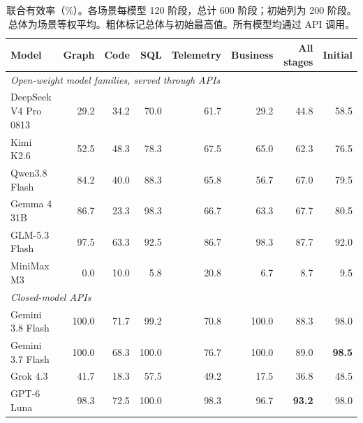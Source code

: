 \begin{table}[t]
\centering\small\setlength{\tabcolsep}{5pt}
\begin{tabular}{lrrrrrrr}
\toprule
Model & Graph & Code & SQL & Telemetry & Business & All stages & Initial \\
\midrule
\multicolumn{8}{l}{\emph{Open-weight model families, served through APIs}}\\
DeepSeek V4 Pro 0813 & 29.2 & 34.2 & 70.0 & 61.7 & 29.2 & 44.8 & 58.5 \\
Kimi K2.6 & 52.5 & 48.3 & 78.3 & 67.5 & 65.0 & 62.3 & 76.5 \\
Qwen3.8 Flash & 84.2 & 40.0 & 88.3 & 65.8 & 56.7 & 67.0 & 79.5 \\
Gemma 4 31B & 86.7 & 23.3 & 98.3 & 66.7 & 63.3 & 67.7 & 80.5 \\
GLM-5.3 Flash & 97.5 & 63.3 & 92.5 & 86.7 & 98.3 & 87.7 & 92.0 \\
MiniMax M3 & 0.0 & 10.0 & 5.8 & 20.8 & 6.7 & 8.7 & 9.5 \\
\midrule
\multicolumn{8}{l}{\emph{Closed-model APIs}}\\
Gemini 3.8 Flash & 100.0 & 71.7 & 99.2 & 70.8 & 100.0 & 88.3 & 98.0 \\
Gemini 3.7 Flash & 100.0 & 68.3 & 100.0 & 76.7 & 100.0 & 89.0 & \textbf{98.5} \\
Grok 4.3 & 41.7 & 18.3 & 57.5 & 49.2 & 17.5 & 36.8 & 48.5 \\
GPT-6 Luna & 98.3 & 72.5 & 100.0 & 98.3 & 96.7 & \textbf{93.2} & 98.0 \\
\bottomrule
\end{tabular}
\caption{联合有效率（\%）。各场景每模型 120 阶段，总计 600 阶段；初始列为 200 阶段。总体为场景等权平均。粗体标记总体与初始最高值。所有模型均通过 API 调用。}
\label{tab:zh_quality}
\end{table}